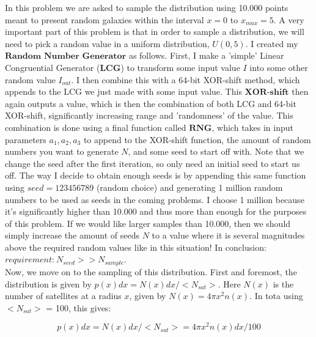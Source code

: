In this problem we are asked to sample the distribution using 10.000 points meant to present random galaxies within the interval $x= 0$ to $x_{max} = 5$. A very important part of this problem is that in order to sample a distribution, we will need to pick a random value in a uniform distribution, $U(0,5)$. I created my $\textbf{Random Number Generator}$ as follows. First, I make a 'simple' Linear Congruential Generator ($\textbf{LCG}$) to transform some input value $I$ into some other random value $I_{out}$. I then combine this with a 64-bit XOR-shift method, which appends to the LCG we just made with some input value. This $\textbf{XOR-shift}$ then again outputs a value, which is then the combination of both LCG and 64-bit XOR-shift, significantly increasing range and 'randomness' of the value. This combination is done using a final function called $\textbf{RNG}$, which takes in input parameters $a_1,a_2,a_3$ to append to the XOR-shift function, the amount of random numbers you want to generate $N$, and some seed to start off with. Note that we change the seed after the first iteration, so only need an initial seed to start us off. The way I decide to obtain enough seeds is by appending this same function using $seed = 123456789$ (random choice) and generating 1 million random numbers to be used as seeds in the coming problems. I choose 1 million because it's significantly higher than 10.000 and thus more than enough for the purposes of this problem. If we would like larger samples than 10.000, then we should simply increase the amount of seeds $N$ to a value where it is several magnitudes above the required random values like in this situation! In conclusion: $\textit{requirement:} \ N_{seed} >> N_{sample}$.\\

Now, we move on to the sampling of this distribution. First and foremost, the distribution is given by $p(x) dx = N(x) dx / <N_{sat}>$. Here $N(x)$ is the number of satellites at a radius $x$, given by $N(x) = 4\pi x^2 n(x)$. In tota using $<N_{sat}>$ = 100, this gives: 

\begin{equation}
	p(x) dx = N(x) dx /<N_{sat}> = 4\pi x^2 n(x) dx/100
\end{equation}

